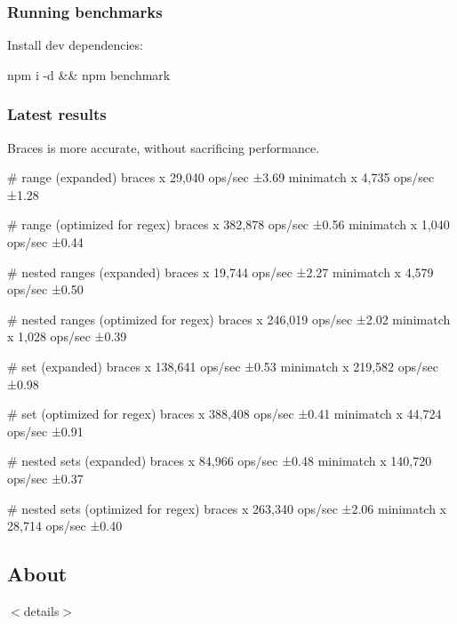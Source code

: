 \subsubsection*{Running benchmarks}

Install dev dependencies\+:


\begin{DoxyCode}
npm i -d && npm benchmark
\end{DoxyCode}


\subsubsection*{Latest results}

Braces is more accurate, without sacrificing performance.


\begin{DoxyCode}
# range (expanded)
  braces x 29,040 ops/sec ±3.69%
  minimatch x 4,735 ops/sec ±1.28%

# range (optimized for regex)
  braces x 382,878 ops/sec ±0.56%
  minimatch x 1,040 ops/sec ±0.44%

# nested ranges (expanded)
  braces x 19,744 ops/sec ±2.27%
  minimatch x 4,579 ops/sec ±0.50%

# nested ranges (optimized for regex)
  braces x 246,019 ops/sec ±2.02%
  minimatch x 1,028 ops/sec ±0.39%

# set (expanded) 
  braces x 138,641 ops/sec ±0.53%
  minimatch x 219,582 ops/sec ±0.98%

# set (optimized for regex)
  braces x 388,408 ops/sec ±0.41%
  minimatch x 44,724 ops/sec ±0.91%

# nested sets (expanded)
  braces x 84,966 ops/sec ±0.48%
  minimatch x 140,720 ops/sec ±0.37%

# nested sets (optimized for regex)
  braces x 263,340 ops/sec ±2.06%
  minimatch x 28,714 ops/sec ±0.40%
\end{DoxyCode}


\subsection*{About}

$<$details$>$ 

